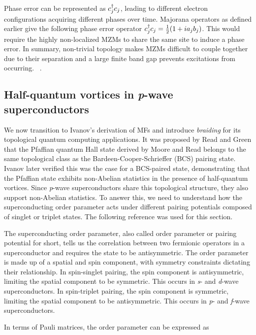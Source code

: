 Phase error can be represented as $c^{\dagger}_j c_j$, leading to different electron configurations acquiring different phases over time.
Majorana operators as defined earlier give the following phase error operator $c^{\dagger}_j c_j = \frac{1}{2} (1+ i a_j b_j)$.
This would require the highly non-localized MZMs to share the same site to induce a phase error.
In summary, non-trivial topology makes MZMs difficult to couple together due to their separation and a large finite band gap prevents excitations from occurring.
~\cite{kitaevUnpairedMajoranaFermions2001}.


\subsection{Half-quantum vortices in \textit{p}-wave superconductors}
We now transition to Ivanov's derivation of MFs and introduce \textit{braiding} for its topological quantum computing applications.
It was proposed by Read and Green that the Pfaffian quantum Hall state derived by Moore and Read belongs to the same topological class as the Bardeen-Cooper-Schrieffer (BCS) pairing state.
Ivanov later verified this was the case for a BCS-paired state, demonstrating that the Pfaffian state exhibits non-Abelian statistics in the presence of half-quantum vortices.
Since \textit{p}-wave superconductors share this topological structure, they also support non-Abelian statistics.
To answer this, we need to understand how the superconducting order parameter acts under different pairing potentials composed of singlet or triplet states.
The following reference was used for this section.

The superconducting order parameter, also called order parameter or pairing potential for short, tells us the correlation between two fermionic operators in a superconductor and requires the state to be antisymmetric.
The order parameter is made up of a spatial and spin component, with symmetry constraints dictating their relationship.
In spin-singlet pairing, the spin component is antisymmetric, limiting the spatial component to be symmetric.
This occurs in \textit{s}- and \textit{d}-wave superconductors.
In spin-triplet pairing, the spin component is symmetric, limiting the spatial component to be antisymmetric.
This occurs in \textit{p}- and \textit{f}-wave superconductors.

In terms of Pauli matrices, the order parameter can be expressed as

